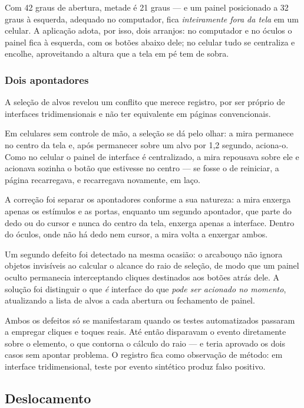 Com 42 graus de abertura, metade é 21 graus --- e um painel posicionado a
32 graus à esquerda, adequado no computador, fica \emph{inteiramente fora
da tela} em um celular. A aplicação adota, por isso, dois arranjos: no
computador e no óculos o painel fica à esquerda, com os botões abaixo
dele; no celular tudo se centraliza e encolhe, aproveitando a altura que
a tela em pé tem de sobra.

\subsubsection{Dois apontadores}

A seleção de alvos revelou um conflito que merece registro, por ser
próprio de interfaces tridimensionais e não ter equivalente em páginas
convencionais.

Em celulares sem controle de mão, a seleção se dá pelo olhar: a mira
permanece no centro da tela e, após permanecer sobre um alvo por 1,2
segundo, aciona-o. Como no celular o painel de interface é centralizado,
a mira repousava sobre ele e acionava sozinha o botão que estivesse no
centro --- se fosse o de reiniciar, a página recarregava, e recarregava
novamente, em laço.

A correção foi separar os apontadores conforme a sua natureza: a mira
enxerga apenas os estímulos e as portas, enquanto um segundo apontador,
que parte do dedo ou do cursor e nunca do centro da tela, enxerga apenas
a interface. Dentro do óculos, onde não há dedo nem cursor, a mira volta
a enxergar ambos.

Um segundo defeito foi detectado na mesma ocasião: o arcabouço não ignora
objetos invisíveis ao calcular o alcance do raio de seleção, de modo que
um painel oculto permanecia interceptando cliques destinados aos botões
atrás dele. A solução foi distinguir o que \emph{é} interface do que
\emph{pode ser acionado no momento}, atualizando a lista de alvos a cada
abertura ou fechamento de painel.

Ambos os defeitos só se manifestaram quando os testes automatizados
passaram a empregar cliques e toques reais. Até então disparavam o evento
diretamente sobre o elemento, o que contorna o cálculo do raio --- e
teria aprovado os dois casos sem apontar problema. O registro fica como
observação de método: em interface tridimensional, teste por evento
sintético produz falso positivo.

\subsection{Deslocamento}

